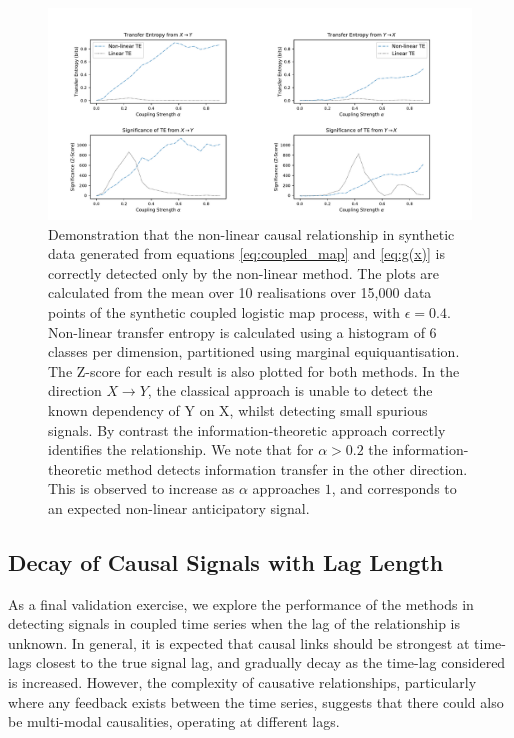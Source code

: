 \documentclass[]{rsos}%
\begin{document}
{\begin{figure}[!htb]
    \includegraphics[width=\linewidth]{images/confirming_logmap.pdf}
    \caption{Demonstration that the non-linear causal relationship in synthetic data generated from equations \ref{eq:coupled_map} and \ref{eq:g(x)} is correctly detected only by the non-linear method. The plots are calculated from the mean over 10 realisations over 15,000 data points of the synthetic coupled logistic map process, with $\epsilon = 0.4$. Non-linear transfer entropy is calculated using a histogram of 6 classes per dimension, partitioned using marginal equiquantisation. The Z-score for each result is also plotted for both methods. In the direction $X \rightarrow Y$, the classical approach is unable to detect the known dependency of Y on X, whilst detecting small spurious signals. By contrast the information-theoretic approach correctly identifies the relationship.  We note that for $\alpha>0.2$ the information-theoretic method detects information transfer in the other direction. This is observed to increase as $\alpha$ approaches $1$, and corresponds to an expected non-linear anticipatory signal.
    }
    \label{fig:CLM_confirmation}
    
  \end{figure}


  \subsection{Decay of Causal Signals with Lag Length}
  As a final validation exercise, we explore the performance of the methods in detecting signals in coupled time series when the lag of the relationship is unknown. In general, it is expected that causal links should be strongest at time-lags closest to the true signal lag, and gradually decay as the time-lag considered is increased. However, the complexity of causative relationships, particularly where any feedback exists between the time series, suggests that there could also be multi-modal causalities, operating at different lags.  

}
\end{document}
